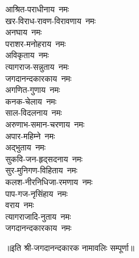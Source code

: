 \begin{flushleft}
\begin{multicols}{2}
आश्रित-पराधीनाय~नमः\\
खर-विराध-रावण-विरावणाय~नमः\\
अनघाय~नमः\\
पराशर-मनोहराय~नमः\\
अविकृताय~नमः\\
त्यागराज-सन्नुताय~नमः\\
जगदानन्दकारकाय~नमः\\
अगणित-गुणाय~नमः\\
कनक-चेलाय~नमः\\
साल-विदलनाय~नमः\hfill{}\\
अरुणाभ-समान-चरणाय~नमः\\
अपार-महिम्ने~नमः\\
अद्भुताय~नमः\\
सुकवि-जन-हृद्सदनाय~नमः\\
सुर-मुनिगण-विहिताय~नमः\\
कलश-नीरनिधिजा-रमणाय~नमः\\
पाप-गज-नृसिंहाय~नमः\\
वराय~नमः\\
त्यागराजादि-नुताय~नमः\\
जगदानन्दकारकाय~नमः\hfill{}\\
\end{multicols}
\end{flushleft}
॥इति श्री-जगदानन्दकारक नामावलिः सम्पूर्णा॥
